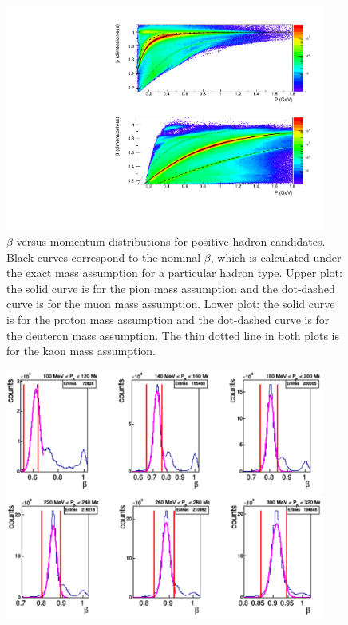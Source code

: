 \documentclass[,superscriptaddress,showpacs,amssymb,amsmath,amsfonts,linenumbers,article]{revtex4-1}
\begin{document}
\begin{enumerate}[label=\textbf{\arabic*}.]
\begin{figure}[!ht]
\begin{center}
\includegraphics[width=10.5cm]{pictures/hadr_id.pdf}
\end{center}
\caption{\small $\beta$ versus momentum distributions for positive hadron candidates. Black curves correspond to the nominal $\beta$, which is calculated under the exact mass assumption for a particular hadron type. Upper plot: the solid curve is for the pion mass assumption and the dot-dashed curve is for the muon mass assumption. Lower plot: the solid curve is for the proton mass assumption and the  dot-dashed curve is for the deuteron mass assumption. The thin dotted line in both plots is for the kaon mass assumption. }  
\end{figure}
\begin{figure}[!ht]
\begin{center}
\includegraphics[width=10.5cm]{pictures/pip_id1.pdf}
\includegraphics[width=10.5cm]{pictures/pip_id2.pdf}

\end{center}
\end{figure}
\end{enumerate}
\end{document}
